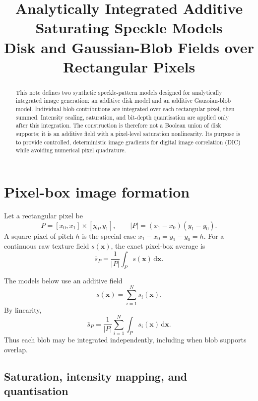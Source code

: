 \documentclass[11pt,a4paper]{article}
\title{Analytically Integrated Additive Saturating Speckle Models\\
\large Disk and Gaussian-Blob Fields over Rectangular Pixels}
\author{}
\date{}
\begin{document}
\maketitle

\begin{abstract}
This note defines two synthetic speckle-pattern models designed for analytically
integrated image generation: an additive disk model and an additive Gaussian-blob
model. Individual blob contributions are integrated over each rectangular pixel,
then summed. Intensity scaling, saturation, and bit-depth quantisation are applied
only after this integration. The construction is therefore not a Boolean union of
disk supports; it is an additive field with a pixel-level saturation nonlinearity.
Its purpose is to provide controlled, deterministic image gradients for digital
image correlation (DIC) while avoiding numerical pixel quadrature.
\end{abstract}

\section{Pixel-box image formation}

Let a rectangular pixel be
\begin{equation}
P=[x_0,x_1]\times[y_0,y_1],
\qquad
|P|=(x_1-x_0)(y_1-y_0).
\end{equation}
A square pixel of pitch $h$ is the special case $x_1-x_0=y_1-y_0=h$.
For a continuous raw texture field $s(\bm{x})$, the exact pixel-box average is
\begin{equation}
\bar{s}_P
=
\frac{1}{|P|}\int_P s(\bm{x})\,\mathrm{d}\bm{x}.
\label{eq:pixel-average}
\end{equation}

The models below use an additive field
\begin{equation}
s(\bm{x})=\sum_{i=1}^{N} s_i(\bm{x}).
\end{equation}
By linearity,
\begin{equation}
\bar{s}_P
=
\frac{1}{|P|}\sum_{i=1}^{N}\int_P s_i(\bm{x})\,\mathrm{d}\bm{x}.
\label{eq:additive-pixel-average}
\end{equation}
Thus each blob may be integrated independently, including when blob supports
overlap.

\subsection{Saturation, intensity mapping, and quantisation}
\end{document}
